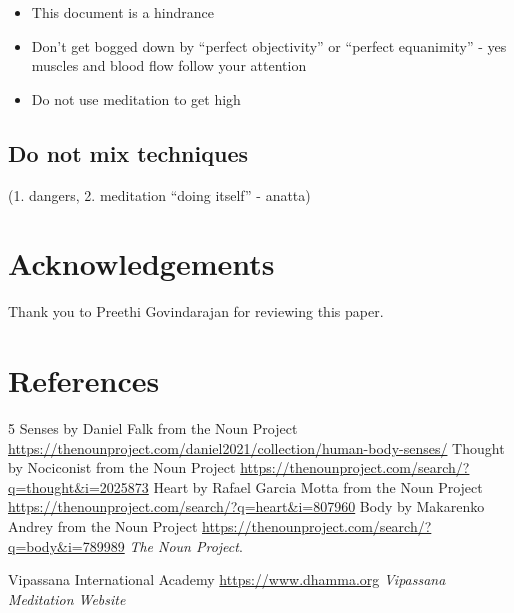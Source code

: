 \documentclass[a4paper, amsfonts, amssymb, amsmath, reprint, showkeys, nofootinbib, twoside]{revtex4-1}
\begin{document}
\begin{itemize}
  \item This document is a hindrance
  \item Don't get bogged down by ``perfect objectivity'' or ``perfect equanimity'' - yes muscles and blood flow follow your attention
  \item Do not use meditation to get high
\end{itemize}

\subsection{Do not mix techniques}

(1. dangers, 2. meditation ``doing itself'' - anatta)


\section*{Acknowledgements}

Thank you to Preethi Govindarajan for reviewing this paper.


\section*{References}

\begin{thebibliography}{99}

  5 Senses by Daniel Falk from the Noun Project
  \url{https://thenounproject.com/daniel2021/collection/human-body-senses/}
  Thought by Nociconist from the Noun Project
  \url{https://thenounproject.com/search/?q=thought&i=2025873}
  Heart by Rafael Garcia Motta from the Noun Project
  \url{https://thenounproject.com/search/?q=heart&i=807960}
  Body by Makarenko Andrey from the Noun Project
  \url{https://thenounproject.com/search/?q=body&i=789989}
  \textit{The Noun Project}.

  Vipassana International Academy
  \url{https://www.dhamma.org}
  \textit{Vipassana Meditation Website}


\end{thebibliography}
\end{document}
